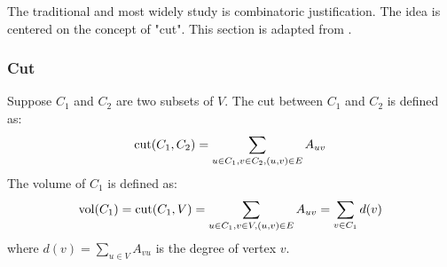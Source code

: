 The traditional and most widely study is combinatoric justification. 
The idea is centered on the concept of "cut". This section is 
adapted from 
\cite{shi2000normalized}
\cite{von2007tutorial}
\cite{dhillon2004unified}. 

\subsubsection{Cut}

Suppose $ C_1 $ and $ C_2 $ are two subsets of $ V $. 
The cut between $ C_1 $ and $ C_2 $ is defined as:
\begin{equation}
	\text{cut}(C_1, C_2) = \sum_{u \in C_1, v \in C_2, (u,v) \in E}{A_{uv}}
\end{equation}
The volume of $ C_1 $ is defined as:
\begin{equation}
	\text{vol}(C_1) = \text{cut}(C_1, V) = \sum_{u \in C_1, v \in V, (u,v) \in E}{A_{uv}}
	 = \sum_{v \in C_1}{d(v)}
\end{equation}
where $ d(v) = \sum_{u \in V}{A_{vu}} $ is the degree of vertex $ v $. 

